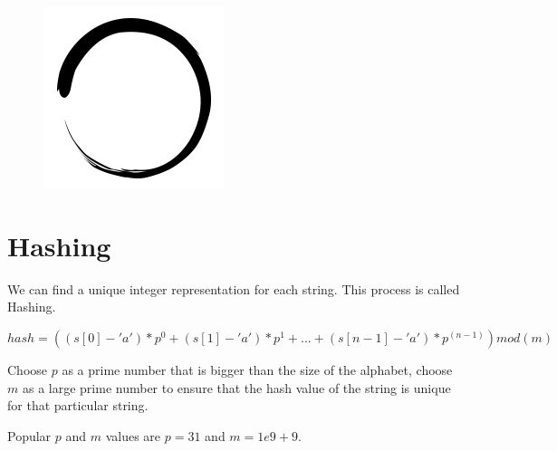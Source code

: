 \documentclass[12pt]{article}
\title{\vspace{-2em}\mytitle\vspace{-0.3em}}
\author{
    	\textbf{Editor}\\
    	Mehmet Altuner  \\ \ \\ 
    }
\date{}
\begin{document}
    	
    	\begin{figure}
    		\centering
    		\includegraphics[width=\linewidth/4]{inzva-logo.png}
    		\label{fig:inzva}
    	\end{figure}
    	\maketitle
    	
    	\cleardoublepage
    	\tableofcontents
    	\cleardoublepage
    	
    	\section{Hashing}
    	We can find a unique integer representation for each string. This process is called Hashing.
    	
    $hash = ((s[0] - 'a') * p^0 + (s[1] - 'a') * p^1 + ... + (s[n-1] - 'a') * p^(n-1)) mod (m)$  
    
        Choose $p$ as a prime number that is bigger than the size of the alphabet, choose $m$ as a large prime number to ensure that the hash value of the string is unique for that particular string.
        
        Popular $p$ and $m$ values are $p = 31$ and $m = 1e9 + 9$.
    	
\end{document}
